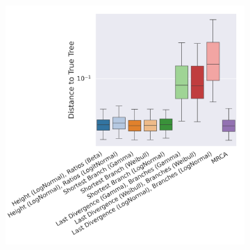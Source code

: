 \documentclass[10pt,letterpaper]{article}
\begin{document}
\begin{figure}
	\begin{subfigure}[b]{0.4\textwidth}
		\centering
		\includegraphics[width=\textwidth]{figures/yule-400-ccd1-point-estimates.png}
	\end{subfigure}
	
	\label{fig:accuracy-point-estimators}
\end{figure}
\end{document}
